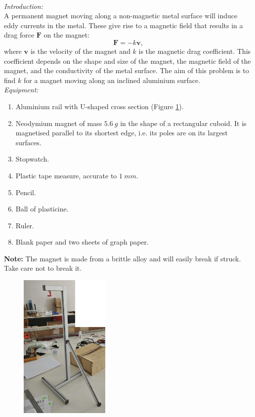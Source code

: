\documentclass[../TST.tex]{subfiles}
\begin{document}
\begin{eproblem}{\ \\[5pt]}
\textit{Introduction:}\\
A permanent magnet moving along a non-magnetic metal surface will induce eddy currents in the metal. These give rise to a magnetic field that results in a drag force $\mathbf{F}$ on the magnet:
\begin{equation*}
\mathbf{F}=-k\mathbf{v}
,
\end{equation*}
where $\mathbf{v}$ is the velocity of the magnet and $k$ is the magnetic drag coefficient. This coefficient depends on the shape and size of the magnet, the magnetic field of the magnet, and the conductivity of the metal surface. The aim of this problem is to find $k$ for a magnet moving along an inclined aluminium surface.\\

\textit{Equipment:}
\begin{enumerate}
	\item Aluminium rail with U-shaped cross section (Figure \ref{fig1}).
	\item Neodymium magnet of mass $\qty{5.6}{g}$ in the shape of a rectangular cuboid. It is magnetised parallel to its shortest edge, i.e. its poles are on its largest surfaces.
	\item Stopwatch.
	\item Plastic tape measure, accurate to $\qty{1}{mm}$.
	\item Pencil.
	\item Ball of plasticine.
	\item Ruler.
	\item Blank paper and two sheets of graph paper.
\end{enumerate}
\textbf{Note:} The magnet is made from a brittle alloy and will easily break if struck. Take care not to break it.\\
\begin{figure}[h]
\centering
\includegraphics[width=0.39\textwidth]{fig/2013_e2.jpg}
\caption{}
\label{fig1}
\end{figure}


\end{eproblem}
\end{document}
